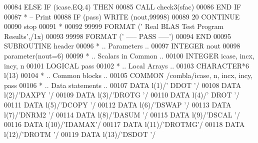 \begin{DoxyCode}
00084          \textcolor{keywordflow}{ELSE} \textcolor{keywordflow}{IF} (icase.EQ.4) \textcolor{keywordflow}{THEN}
00085             \textcolor{keyword}{CALL }check3(sfac)
00086 \textcolor{keywordflow}{         END IF}
00087 \textcolor{comment}{*        -- Print}
00088          \textcolor{keywordflow}{IF} (pass) \textcolor{keyword}{WRITE} (nout,99998)
00089    20 \textcolor{keywordflow}{CONTINUE}
00090       stop
00091 \textcolor{comment}{*}
00092 99999 \textcolor{keyword}{FORMAT} (\textcolor{stringliteral}{' Real BLAS Test Program Results'},/1x)
00093 99998 \textcolor{keyword}{FORMAT} (\textcolor{stringliteral}{'                                    ----- PASS -----'})
00094 \textcolor{keyword}{      END}
00095 \textcolor{keyword}{      SUBROUTINE }header
00096 \textcolor{comment}{*     .. Parameters ..}
00097       \textcolor{keywordtype}{INTEGER}          nout
00098       parameter(nout=6)
00099 \textcolor{comment}{*     .. Scalars in Common ..}
00100       \textcolor{keywordtype}{INTEGER}          icase, incx, incy, n
00101       \textcolor{keywordtype}{LOGICAL}          pass
00102 \textcolor{comment}{*     .. Local Arrays ..}
00103       \textcolor{keywordtype}{CHARACTER*6}      l(13)
00104 \textcolor{comment}{*     .. Common blocks ..}
00105       \textcolor{keyword}{COMMON}           /combla/icase, n, incx, incy, pass
00106 \textcolor{comment}{*     .. Data statements ..}
00107       \textcolor{keyword}{DATA}             l(1)/\textcolor{stringliteral}{' DDOT '}/
00108       \textcolor{keyword}{DATA}             l(2)/\textcolor{stringliteral}{'DAXPY '}/
00109       \textcolor{keyword}{DATA}             l(3)/\textcolor{stringliteral}{'DROTG '}/
00110       \textcolor{keyword}{DATA}             l(4)/\textcolor{stringliteral}{' DROT '}/
00111       \textcolor{keyword}{DATA}             l(5)/\textcolor{stringliteral}{'DCOPY '}/
00112       \textcolor{keyword}{DATA}             l(6)/\textcolor{stringliteral}{'DSWAP '}/
00113       \textcolor{keyword}{DATA}             l(7)/\textcolor{stringliteral}{'DNRM2 '}/
00114       \textcolor{keyword}{DATA}             l(8)/\textcolor{stringliteral}{'DASUM '}/
00115       \textcolor{keyword}{DATA}             l(9)/\textcolor{stringliteral}{'DSCAL '}/
00116       \textcolor{keyword}{DATA}             l(10)/\textcolor{stringliteral}{'IDAMAX'}/
00117       \textcolor{keyword}{DATA}             l(11)/\textcolor{stringliteral}{'DROTMG'}/
00118       \textcolor{keyword}{DATA}             l(12)/\textcolor{stringliteral}{'DROTM '}/
00119       \textcolor{keyword}{DATA}             l(13)/\textcolor{stringliteral}{'DSDOT '}/

\end{DoxyCode}
